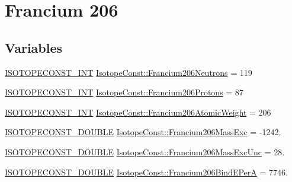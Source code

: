 \hypertarget{group___isotope_const-_francium-_fr206}{}\section{Francium 206}
\label{group___isotope_const-_francium-_fr206}
\subsection*{Variables}
\begin{DoxyCompactItemize}
\item 
\mbox{\hyperlink{group___isotope_const-_macros_ga5f18360b3e99483a35c32d789e62621c}{I\+S\+O\+T\+O\+P\+E\+C\+O\+N\+S\+T\+\_\+\+I\+NT}} \mbox{\hyperlink{group___isotope_const-_francium-_fr206_ga30c162218bf802afeddb3015bd60a788}{Isotope\+Const\+::\+Francium206\+Neutrons}} = 119
\item 
\mbox{\hyperlink{group___isotope_const-_macros_ga5f18360b3e99483a35c32d789e62621c}{I\+S\+O\+T\+O\+P\+E\+C\+O\+N\+S\+T\+\_\+\+I\+NT}} \mbox{\hyperlink{group___isotope_const-_francium-_fr206_ga31b3b5f433270985cfadc089f170fc66}{Isotope\+Const\+::\+Francium206\+Protons}} = 87
\item 
\mbox{\hyperlink{group___isotope_const-_macros_ga5f18360b3e99483a35c32d789e62621c}{I\+S\+O\+T\+O\+P\+E\+C\+O\+N\+S\+T\+\_\+\+I\+NT}} \mbox{\hyperlink{group___isotope_const-_francium-_fr206_gad8a8204dc0905869aa5326e004394982}{Isotope\+Const\+::\+Francium206\+Atomic\+Weight}} = 206
\item 
\mbox{\hyperlink{group___isotope_const-_macros_ga8f45a7272ce02c0b4c65c44636ed719a}{I\+S\+O\+T\+O\+P\+E\+C\+O\+N\+S\+T\+\_\+\+D\+O\+U\+B\+LE}} \mbox{\hyperlink{group___isotope_const-_francium-_fr206_gae132fab68bce120bd64d1971bdf8512d}{Isotope\+Const\+::\+Francium206\+Mass\+Exc}} = -\/1242.
\item 
\mbox{\hyperlink{group___isotope_const-_macros_ga8f45a7272ce02c0b4c65c44636ed719a}{I\+S\+O\+T\+O\+P\+E\+C\+O\+N\+S\+T\+\_\+\+D\+O\+U\+B\+LE}} \mbox{\hyperlink{group___isotope_const-_francium-_fr206_ga31b8a1318e646208afe5a91c73b5e2ae}{Isotope\+Const\+::\+Francium206\+Mass\+Exc\+Unc}} = 28.
\item 
\mbox{\hyperlink{group___isotope_const-_macros_ga8f45a7272ce02c0b4c65c44636ed719a}{I\+S\+O\+T\+O\+P\+E\+C\+O\+N\+S\+T\+\_\+\+D\+O\+U\+B\+LE}} \mbox{\hyperlink{group___isotope_const-_francium-_fr206_ga078bc959353bde87289603eb46b6141c}{Isotope\+Const\+::\+Francium206\+Bind\+E\+PerA}} = 7746.
\item 

\end{DoxyCompactItemize}
